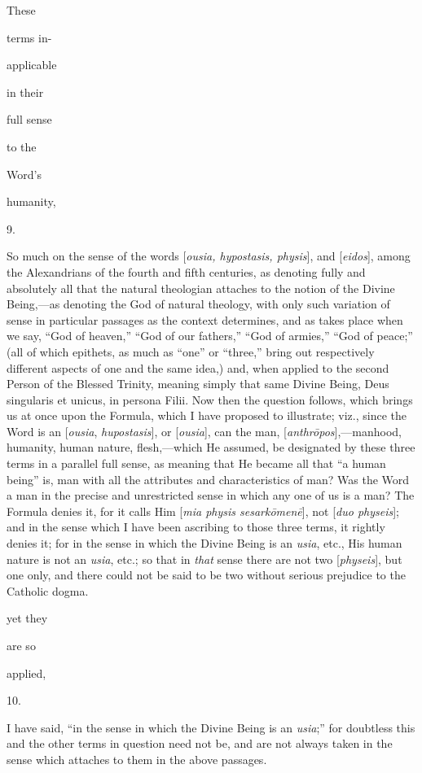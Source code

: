 These

terms in-

applicable

in their

full sense

to the

Word's

humanity,

9.

So much on the sense of the words [\emph{ousia,
hypostasis, physis}], and [\emph{eidos}], among the
Alexandrians of the fourth and fifth centuries, as denoting
fully and absolutely all that the natural theologian attaches
to the notion of the Divine Being,—as denoting the God of
natural theology, with only such variation of sense in
particular passages as the context determines, and as takes
place when we say, ``God of heaven,'' ``God of our fathers,'' ``God
of armies,'' ``God of peace;'' (all of which epithets, as much as
``one'' or ``three,'' bring out respectively different aspects of
one and the same idea,) and, when applied to the second Person
of the Blessed Trinity, meaning simply that same Divine Being,
Deus singularis et unicus, in persona Filii. Now then the
question follows, which brings us at once upon the Formula,
which I have proposed to illustrate; viz., since the Word is
an [\emph{ousia}, \emph{hupostasis}], or [\emph{ousia}], can
the man, [\emph{anthr\={o}pos}],—manhood, humanity, human
nature, flesh,—which He assumed, be designated by these
three terms in a parallel full sense, as meaning that He
became all that ``a human being'' is, man with all the
attributes and characteristics of man? Was the Word a man in
the precise and unrestricted sense in which any one of us is a
man? The Formula denies it, for it calls Him [\emph{mia physis
sesark\={o}men\={e}}], not [\emph{duo physeis}]; and
in the sense which I have been ascribing to those three terms,
it rightly denies it; for in the sense in which the Divine
Being is an \emph{usia}, etc., His human nature is not an \emph{usia},
etc.; so that in \emph{that} sense there are not two [\emph{physeis}],
but one only, and there could not be said to be two without
serious prejudice to the Catholic dogma.

yet they

are so

applied,

10.

I have said, ``in the sense in which the
Divine Being is an \emph{usia};'' for doubtless this and the
other terms in question need not be, and are not always
taken in the sense which attaches to them in the above
passages.

